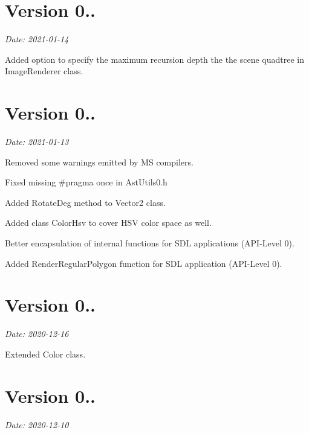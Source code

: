 \section*{Version 0..}

{\itshape Date\+: 2021-\/01-\/14}


\begin{DoxyItemize}
\item Added option to specify the maximum recursion depth the the scene quadtree in {\ttfamily Image\+Renderer} class.
\end{DoxyItemize}

\section*{Version 0..}

{\itshape Date\+: 2021-\/01-\/13}


\begin{DoxyItemize}
\item Removed some warnings emitted by MS compilers.
\item Fixed missing {\ttfamily \#pragma once} in Ast\+Utils0.\+h
\item Added {\ttfamily Rotate\+Deg} method to {\ttfamily Vector2} class.
\item Added class \textquotesingle{} {\ttfamily Color\+Hsv} to cover H\+SV color space as well.
\item Better encapsulation of internal functions for S\+DL applications (A\+P\+I-\/\+Level 0).
\item Added {\ttfamily Render\+Regular\+Polygon} function for S\+DL application (A\+P\+I-\/\+Level 0).
\end{DoxyItemize}

\section*{Version 0..}

{\itshape Date\+: 2020-\/12-\/16}
\begin{DoxyItemize}
\item Extended {\ttfamily Color} class.
\end{DoxyItemize}

\section*{Version 0..}

{\itshape Date\+: 2020-\/12-\/10}


